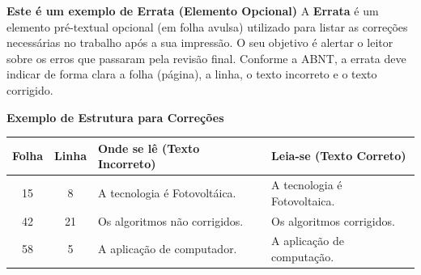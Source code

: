 \documentclass[
	12pt,				%
    oneside,            %
	a4paper,			%
	english,			%
	brazilian,		    %
	]{AcademicoUFT}
\begin{document}
\begin{errata}
    \textbf{Este é um exemplo de Errata (Elemento Opcional)}
    \vspace{0.5cm}
    A \textbf{Errata} é um elemento pré-textual opcional (em folha avulsa) utilizado para listar as correções necessárias no trabalho após a sua impressão. O seu objetivo é alertar o leitor sobre os erros que passaram pela revisão final.
    \vspace{0.5cm}
    Conforme a ABNT, a errata deve indicar de forma clara a folha (página), a linha, o texto incorreto e o texto corrigido.
    \vspace{1cm}

    \textbf{Exemplo de Estrutura para Correções}
    \begin{center}
        \begin{tabular}{|c|c|p{4cm}|p{4cm}|}
            \hline
            \textbf{Folha} & \textbf{Linha} & \textbf{Onde se lê (Texto Incorreto)} & \textbf{Leia-se (Texto Correto)} \\
            \hline
            15 & 8 & A tecnologia é Fotovoltáica. & A tecnologia é Fotovoltaica. \\
            \hline
            42 & 21 & Os algoritmos não corrigidos. & Os algoritmos corrigidos. \\
            \hline
            58 & 5 & A aplicação de computador. & A aplicação de computação. \\
            \hline
        \end{tabular}
    \end{center}
\end{errata}
\end{document}
